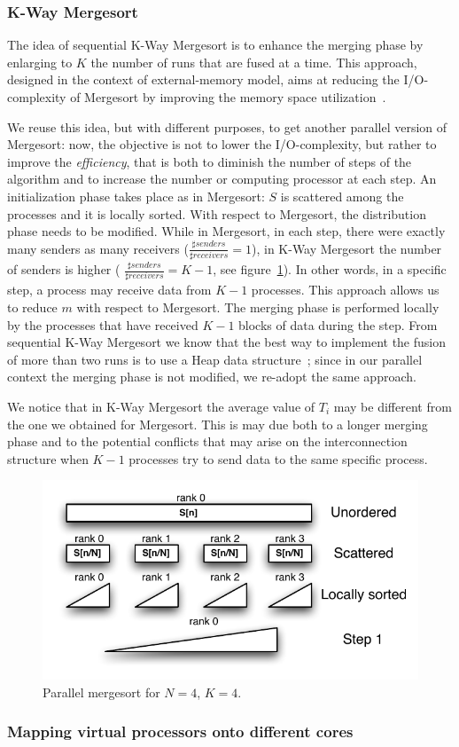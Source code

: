 \subsubsection{K-Way Mergesort}
\label{kmerge}
The idea of sequential K-Way Mergesort is to enhance the merging phase by enlarging to $K$ the number of runs that are fused at a time. This approach, designed in the context of external-memory model, aims at reducing the I/O-complexity of Mergesort by improving the memory space utilization~\cite{FERR}. 

We reuse this idea, but with different purposes, to get another parallel version of Mergesort: now, the objective is not to lower the I/O-complexity, but rather to improve the \textit{efficiency}, that is both to diminish the number of steps of the algorithm and to increase the number or computing processor at each step. An initialization phase takes place as in Mergesort: $S$ is scattered among the processes and it is locally sorted. With respect to Mergesort, the distribution phase needs to be modified. While in Mergesort, in each step, there were exactly many senders as many receivers ($\frac{\sharp senders}{\sharp receivers} = 1$), in K-Way Mergesort the number of senders is higher ( $\frac{\sharp senders}{\sharp receivers} = K - 1$, see figure~\ref{k-merge-dist}). In other words, in a specific step, a process may receive data from $K-1$ processes. This approach allows us to reduce $m$ with respect to Mergesort. The merging phase is performed locally by the processes that have received $K-1$ blocks of data during the step. From sequential K-Way Mergesort we know that the best way to implement the fusion of more than two runs is to use a Heap data structure~\cite{FERR}; since in our parallel context the merging phase is not modified, we re-adopt the same approach.

We notice that in K-Way Mergesort the average value of $T_i$ may be different from the one we obtained for Mergesort. This is may due both to a longer merging phase and to the potential conflicts that may arise on the interconnection structure when $K-1$ processes try to send data to the same specific process.

\begin{figure}[h]
        \centerline{
               \mbox{\includegraphics[scale=0.70]{kmerge-pict1}}
        }
        \caption{Parallel mergesort for $N = 4$, $K = 4$.}
        \label{k-merge-dist}
\end{figure}

\subsubsection*{Mapping virtual processors onto different cores} 
